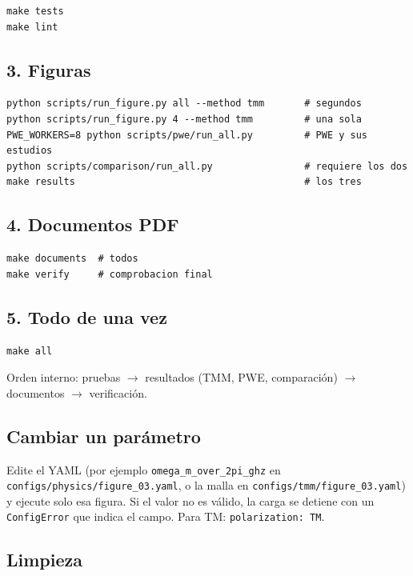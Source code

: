\documentclass[11pt,a4paper]{article}
\begin{document}
\begin{lstlisting}
make tests
make lint
\end{lstlisting}

\subsection{3. Figuras}

\begin{lstlisting}
python scripts/run_figure.py all --method tmm       # segundos
python scripts/run_figure.py 4 --method tmm         # una sola
PWE_WORKERS=8 python scripts/pwe/run_all.py         # PWE y sus estudios
python scripts/comparison/run_all.py                # requiere los dos
make results                                        # los tres
\end{lstlisting}

\subsection{4. Documentos PDF}

\begin{lstlisting}
make documents  # todos
make verify     # comprobacion final
\end{lstlisting}

\subsection{5. Todo de una vez}

\begin{lstlisting}
make all
\end{lstlisting}

Orden interno: pruebas \(\to\) resultados (TMM, PWE, comparación) \(\to\)
documentos \(\to\) verificación.

\subsection{Cambiar un parámetro}

Edite el YAML (por ejemplo \texttt{omega\_m\_over\_2pi\_ghz} en
\texttt{configs/physics/figure\_03.yaml}, o la malla en
\texttt{configs/tmm/figure\_03.yaml}) y ejecute solo esa figura. Si el valor no
es válido, la carga se detiene con un \texttt{ConfigError} que indica el
campo. Para TM: \texttt{polarization: TM}.

\subsection{Limpieza}
\end{document}
